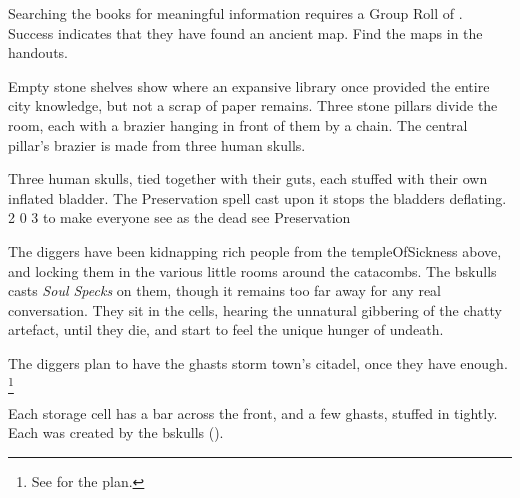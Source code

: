 Searching the books for meaningful information requires a Group Roll of .
Success indicates that they have found an ancient map.
Find the maps in the handouts.

\begin{boxtext}
  Empty stone shelves show where an expansive library once provided the entire city knowledge, but not a scrap of paper remains.
  Three stone pillars divide the room, each with a brazier hanging in front of them by a chain.
  The central pillar's brazier is made from three human skulls.
\end{boxtext}

  {Three human skulls, tied together with their guts, each stuffed with their own inflated bladder.
  The Preservation spell cast upon it stops the bladders deflating.}%
  {2}%
  {0}%
  {3}%
  {to make everyone see as the dead see}%
  {Preservation}%
  {
    \setcounter{Fate}{2}
    \setcounter{Air}{2}
    \setcounter{Water}{1}
    \setcounter{Vigilance}{1}
    \setcounter{Academics}{1}
  }%



\begin{exampletext}
  The \glspl{digger} have been kidnapping rich people from the \gls{templeOfSickness} above, and locking them in the various little rooms around the catacombs.
  The \gls{bskulls} casts \textit{Soul Specks} on them, though it remains too far away for any real conversation.
  They sit in the cells, hearing the unnatural gibbering of the chatty \gls{artefact}, until they die, and start to feel the unique hunger of undeath.

  The \glspl{digger} plan to have the ghasts storm \gls{town}'s citadel, once they have enough.%
  \footnote{See  for the plan.}
\end{exampletext}

Each storage cell has a bar across the front, and a few ghasts, stuffed in tightly.
Each was created by the \gls{bskulls} ().

